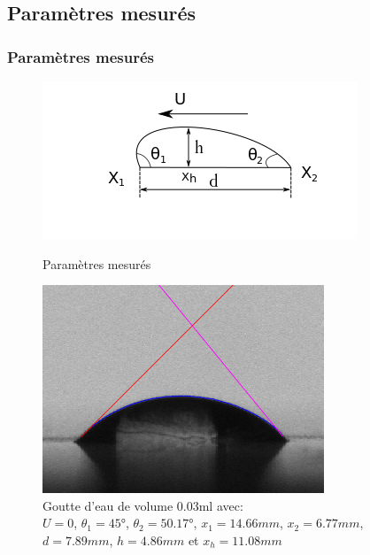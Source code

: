 \documentclass{beamer}
\begin{document}
\subsection{Paramètres mesurés}
\begin{frame}
\frametitle{Paramètres mesurés}
\begin{figure}[!ht]
	\centering
	\begin{minipage}{0.4\linewidth}
		\includegraphics[width = \linewidth]
		{./image/rrgou2.png}
	\caption{Paramètres mesurés}
	\end{minipage}
	\hfill
	\begin{minipage}{0.4\linewidth}
		\includegraphics[width=\linewidth]
		{./image/crop_tvitesse=28_volume=003.png}
	\caption{Goutte d'eau de volume $0.03$ml avec: \\$U = 0$, $\theta_{1} = \ang{45}$, $\theta_{2} = \ang{50.17}$, $x_{1} = 14.66mm$, $x_{2} = 6.77mm$,\\ $d = 7.89mm$, $h = 4.86mm$ et $x_{h} = 11.08mm$}
	\end{minipage}
\end{figure}
\end{frame}
\end{document}
